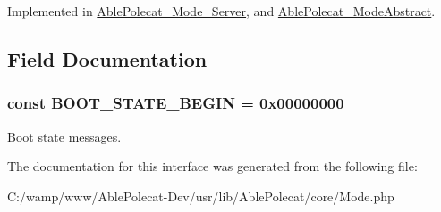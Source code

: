 Implemented in \hyperlink{class_able_polecat___mode___server_a55c20682b992aa8250b1d03f03f58385}{Able\+Polecat\+\_\+\+Mode\+\_\+\+Server}, and \hyperlink{class_able_polecat___mode_abstract_a55c20682b992aa8250b1d03f03f58385}{Able\+Polecat\+\_\+\+Mode\+Abstract}.



\subsection{Field Documentation}
\hypertarget{interface_able_polecat___mode_interface_a9e73b7fe972bda025da142ee02fa2ef7}{}
\subsubsection[{B\+O\+O\+T\+\_\+\+S\+T\+A\+T\+E\+\_\+\+B\+E\+G\+I\+N}]{\setlength{\rightskip}{0pt plus 5cm}const B\+O\+O\+T\+\_\+\+S\+T\+A\+T\+E\+\_\+\+B\+E\+G\+I\+N = 0x00000000}\label{interface_able_polecat___mode_interface_a9e73b7fe972bda025da142ee02fa2ef7}
Boot state messages. 

The documentation for this interface was generated from the following file\+:\begin{DoxyCompactItemize}
\item 
C\+:/wamp/www/\+Able\+Polecat-\/\+Dev/usr/lib/\+Able\+Polecat/core/Mode.\+php\end{DoxyCompactItemize}

